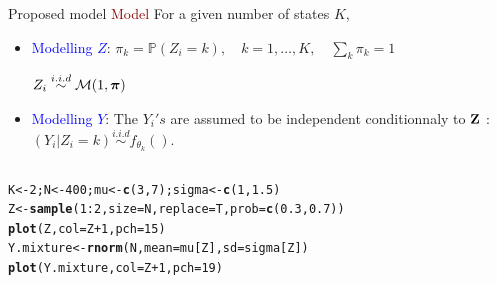 \documentclass{beamer}\usepackage[]{graphicx}\usepackage[]{color}
\makeatletter
\newcommand{\hlnum}[1]{\textcolor[rgb]{0.686,0.059,0.569}{#1}}%
\newcommand{\hlopt}[1]{\textcolor[rgb]{0,0,0}{#1}}%
\newcommand{\hlstd}[1]{\textcolor[rgb]{0.345,0.345,0.345}{#1}}%
\newcommand{\hlkwb}[1]{\textcolor[rgb]{0.69,0.353,0.396}{#1}}%
\newcommand{\hlkwc}[1]{\textcolor[rgb]{0.333,0.667,0.333}{#1}}%
\newcommand{\hlkwd}[1]{\textcolor[rgb]{0.737,0.353,0.396}{\textbf{#1}}}%
\newenvironment{kframe}{%
 \def\at@end@of@kframe{}%
 \ifinner\ifhmode%
  \def\at@end@of@kframe{\end{minipage}}%
  \begin{minipage}{\columnwidth}%
 \fi\fi%
 \def\FrameCommand##1{\hskip\@totalleftmargin \hskip-\fboxsep
 \colorbox{shadecolor}{##1}\hskip-\fboxsep
     \hskip-\linewidth \hskip-\@totalleftmargin \hskip\columnwidth}%
 \MakeFramed {\advance\hsize-\width
   \@totalleftmargin\z@ \linewidth\hsize
   \@setminipage}}%
 {\par\unskip\endMakeFramed%
 \at@end@of@kframe}
\newenvironment{knitrout}{}{} %
\newcommand{\blue}[1]{\textcolor{blue}{#1}}
\newcommand{\emphase}[1]{\textcolor{darkred}{#1}}
\newcommand{\paragraph}[1]{\emphase{#1}}
\renewcommand{\P}{\mathbb{P}}
\newcommand{\Mcal}{\mathcal{M}}
\newcommand{\Zbf}{{\bf Z}}
\newcommand{\pibf}{\mbox{\mathversion{bold}{$\pi$}}}
\makeatother
\begin{document}
\begin{frame}[fragile]{Proposed model}
\paragraph{Model}
For a given number of states $K$, 
\begin{itemize}
\item
 \blue{Modelling $Z$}: $\pi_k=\P(Z_i=k), \quad k=1,\ldots, K, \quad \sum_k \pi_k=1$\par
 $Z_i \overset{i.i.d}{\sim} \Mcal(1, \pibf)$
 \item \blue{Modelling $Y$}: The $Y_i's$ are assumed to be independent  conditionnaly to $\Zbf$ : $(Y_i\vert Z_i = k) \overset{i.i.d}{\sim} f_{\theta_k}().$
\end{itemize}
\begin{columns}
  \begin{column}{0.45\textwidth}
\begin{knitrout}\tiny
{}\color{fgcolor}\begin{kframe}
\begin{alltt}
\hlstd{K} \hlkwb{<-} \hlnum{2}\hlstd{; N} \hlkwb{<-} \hlnum{400}\hlstd{; mu} \hlkwb{<-} \hlkwd{c}\hlstd{(}\hlnum{3}\hlstd{,} \hlnum{7}\hlstd{); sigma} \hlkwb{<-} \hlkwd{c}\hlstd{(}\hlnum{1}\hlstd{,}\hlnum{1.5}\hlstd{)}
\hlstd{Z} \hlkwb{<-} \hlkwd{sample}\hlstd{(}\hlnum{1}\hlopt{:}\hlnum{2}\hlstd{,} \hlkwc{size} \hlstd{= N,} \hlkwc{replace}\hlstd{=T,} \hlkwc{prob}\hlstd{=}\hlkwd{c}\hlstd{(}\hlnum{0.3}\hlstd{,} \hlnum{0.7}\hlstd{))}
\hlkwd{plot}\hlstd{(Z,} \hlkwc{col}\hlstd{=Z}\hlopt{+}\hlnum{1}\hlstd{,} \hlkwc{pch}\hlstd{=}\hlnum{15}\hlstd{)}
\hlstd{Y.mixture} \hlkwb{<-} \hlkwd{rnorm}\hlstd{(N,} \hlkwc{mean}\hlstd{=mu[Z],} \hlkwc{sd}\hlstd{=sigma[Z])}
\hlkwd{plot}\hlstd{(Y.mixture,} \hlkwc{col}\hlstd{=Z}\hlopt{+}\hlnum{1}\hlstd{,} \hlkwc{pch}\hlstd{=}\hlnum{19}\hlstd{)}
\end{alltt}
\end{kframe}
\end{knitrout}
 \end{column}
  \begin{column}{0.45\textwidth}

\end{column}
\end{columns}
\end{frame}
\end{document}
